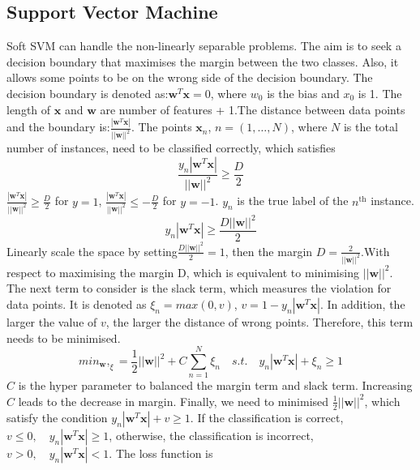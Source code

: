 \subsection{Support Vector Machine}


Soft SVM can handle the non-linearly separable problems. The aim is to seek a decision boundary that maximises the margin between the two classes. Also, it allows some points to be on the wrong side of the decision boundary. The decision boundary is denoted as:$\mathbf{w}^T\mathbf{x}=0$, where $w_0$ is the bias and $x_0$ is 1. The length of $\mathbf{x}$ and $\mathbf{w}$ are number of features + 1.The distance between data points and the boundary is:$\frac{|\mathbf{w}^T\mathbf{x}|}{||\mathbf{w}||^2}$. The points $\mathbf{x}_n$, $n=(1, \dots, N)$, where $N$ is the total number of instances, need to be classified correctly, which satisfies
\begin{equation}
\frac{y_n|\mathbf{w}^T\mathbf{x}|}{||\mathbf{w}||^2}\geq \frac{D}{2} 
\end{equation} 
$\frac{|\mathbf{w}^T\mathbf{x}|}{||\mathbf{w}||^2}\geq \frac{D}{2}$ for $y=1$, $\frac{|\mathbf{w}^T\mathbf{x}|}{||\mathbf{w}||^2}\leq -\frac{D}{2}$ for $y=-1$. $y_n$ is the true label of the $n^\text{th}$ instance.
\begin{equation}
{y_n|\mathbf{w}^T\mathbf{x}|}\geq \frac{D||\mathbf{w}||^2}{2} 
\end{equation} 
Linearly scale the space by setting$\frac{D||\mathbf{w}||^2}{2}=1$, then the margin $D=\frac{2}{||\mathbf{w}||^2}$.With respect to maximising the margin D, which is equivalent to minimising $||\mathbf{w}||^2$.
The next term to consider is the slack term, which measures the violation for data points. It is denoted as $\xi_n=max(0, v)$, $v=1-y_n|\mathbf{\mathbf{w}}^T\mathbf{\mathbf{x}}|$. In addition, the larger the value of $v$, the larger the distance of wrong points. Therefore, this term needs to be minimised.
\begin{equation}
min_\mathbf{w},_\xi=\frac{1}{2}||\mathbf{w}||^2+C\sum_{n=1}^{N} \xi_n \quad s.t.\quad y_n|\mathbf{w}^T\mathbf{x}|+\xi_n\geq 1
\end{equation}
$C$ is the hyper parameter to balanced the margin term and slack term. Increasing $C$ leads to the decrease in margin. Finally, we need to minimised $\frac{1}{2}||\mathbf{w}||^2$, which satisfy the condition $ y_n|\mathbf{w}^T\mathbf{x}|+v\geq 1$. 
If the classification is correct, $v\leq0,\quad y_n|\mathbf{w}^T\mathbf{x}|\geq 1$, otherwise, the classification is incorrect, $v>0,\quad y_n|\mathbf{w}^T\mathbf{x}|< 1$. The loss function is 
